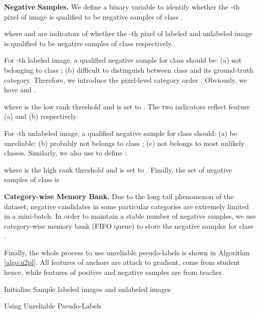 \documentclass[10pt, twocolumn, letterpaper]{article}
\begin{document}
\noindent\textbf{Negative Samples.}
We define a binary variable  to identify whether the -th pixel of image  is qualified to be negative samples of class .

where  and  are indicators of whether the -th pixel of labeled and unlabeled image  is qualified to be negative samples of class  respectively.

For -th labeled image, a qualified negative sample for class  should be: (a) not belonging to class ; (b) difficult to distinguish between class  and its ground-truth category.
Therefore, we introduce the pixel-level category order . Obviously, we have  and .

where  is the low rank threshold and is set to .
The two indicators reflect feature (a) and (b) respectively.

For -th unlabeled image, a qualified negative sample for class  should: (a) be unreliable; (b) probably not belongs to class ; (c) not belongs to most unlikely classes.
Similarly, we also use  to define :

where  is the high rank threshold and is set to .
Finally, the set of negative samples of class  is




\noindent\textbf{Category-wise Memory Bank.}
Due to the long tail phenomenon of the dataset, negative candidates in some particular categories are extremely limited in a mini-batch. 
In order to maintain a stable number of negative samples, we use category-wise memory bank  (FIFO queue) to store the negative samples for class .



Finally, the whole process to use unreliable pseudo-labels is shown in Algorithm \ref{algo:u2pl}.
All features of anchors are attach to gradient, come from student hence,
while features of positive and negative samples are from teacher.





\begin{algorithm}[t]
  \SetAlgoLined

  Initialize \;
  Sample labeled images  and unlabeled images \;
  
  
  \caption{Using Unreliable Pseudo-Labels}
  \label{algo:u2pl}
\end{algorithm}
\end{document}
